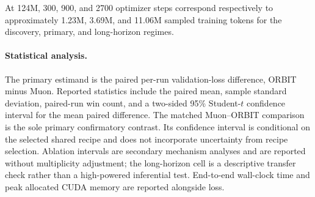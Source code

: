 At 124M, 300, 900, and 2700 optimizer steps correspond respectively to approximately
1.23M, 3.69M, and 11.06M sampled training tokens for the discovery, primary, and
long-horizon regimes.

\paragraph{Statistical analysis.}
The primary estimand is the paired per-run validation-loss difference, ORBIT minus Muon.
Reported statistics include the paired mean, sample standard deviation, paired-run win
count, and a two-sided 95\% Student-$t$ confidence interval for the mean paired difference.
The matched Muon--ORBIT comparison is the sole primary confirmatory contrast. Its confidence
interval is conditional on the selected shared recipe and does not incorporate uncertainty
from recipe selection. Ablation intervals are secondary mechanism analyses and are reported
without multiplicity adjustment; the long-horizon cell is a descriptive transfer check
rather than a high-powered inferential test. End-to-end wall-clock time and peak allocated
CUDA memory are reported alongside loss.